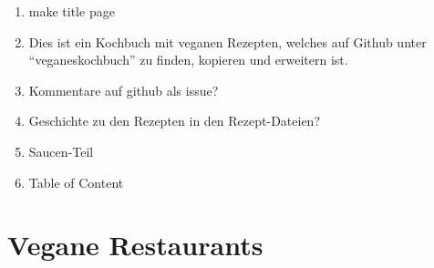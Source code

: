 \documentclass[12pt,a4paper]{article}
\begin{document}
\begin{enumerate}
	\item make title page
	\item Dies ist ein Kochbuch mit veganen Rezepten, welches auf Github unter \enquote{veganeskochbuch} zu finden, kopieren und erweitern ist.\\
	\item Kommentare auf github als issue?
	\item Geschichte zu den Rezepten in den Rezept-Dateien?
	\item Saucen-Teil
	\item Table of Content
\end{enumerate}
\clearpage
	
	
	
%	

\section{Vegane Restaurants}
	
\end{document}
